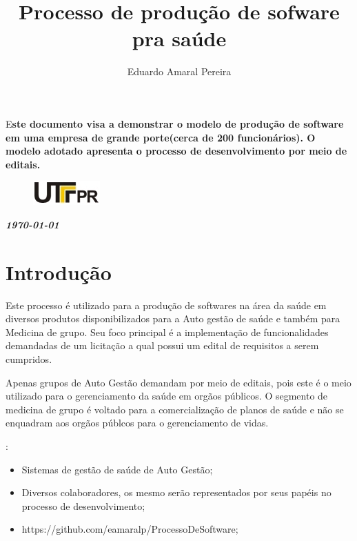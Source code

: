 \documentclass[	DIV=calc,%
							paper=a4,%
							fontsize=12pt,%
							onecolumn]{scrartcl}	 					%
\title{Processo de produção de sofware pra saúde}		%
\author{Eduardo Amaral Pereira }  	%
\date{}																				%
\newcommand{\initial}[1]{%
     \lettrine[lines=3,lhang=0.3,nindent=0em]{
     				\color{DarkGoldenrod}
     				{\textsf{#1}}}{}}
\begin{document}
\maketitle
\thispagestyle{fancy} 	
\thispagestyle{empty}		%


\initial{E}\textbf{ste documento visa a demonstrar o modelo de produção de software em uma empresa de grande porte(cerca de 200 funcionários). O modelo adotado apresenta o processo de desenvolvimento por meio de editais.}

\begin{figure}
	\centering
	\includegraphics{utfpr}
\end{figure}

\vspace{3cm}
\centerline{\textit{\textbf{\today}}}

\clearpage
    \renewcommand*\listfigurename{Lista de figuras}
\listoffigures

\renewcommand*\listtablename{Lista de tabelas}
\listoftables


\clearpage
\renewcommand{\contentsname}{Sumário}
\tableofcontents
\clearpage

\section{Introdução}
Este processo é utilizado para a produção de softwares na área da saúde em diversos produtos disponibilizados para
a Auto gestão de saúde e também para Medicina de grupo. Seu foco principal é a implementação de funcionalidades demandadas
de um licitação a qual possui um edital de requisitos a serem cumpridos.

Apenas grupos de Auto Gestão demandam por meio de editais, pois este é o meio utilizado para o gerenciamento da saúde
em orgãos públicos. O segmento de medicina de grupo é voltado para a comercialização de planos de saúde e não se enquadram
aos orgãos públcos para o gerenciamento de vidas.

:

\begin{itemize}
	\item Sistemas de gestão de saúde de Auto Gestão;
	\item Diversos colaboradores, os mesmo serão representados por seus papéis no processo de desenvolvimento;
	\item https://github.com/eamaralp/ProcessoDeSoftware;
\end{itemize}
\end{document}
